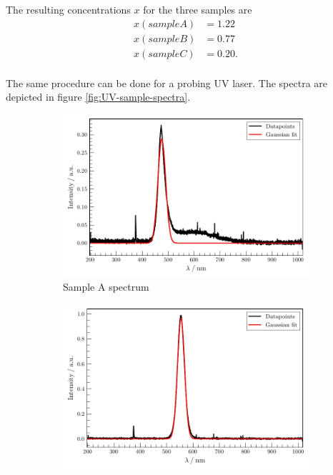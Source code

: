The resulting concentrations $x$ for the three samples are
\begin{align*}
    x(sample A) &= \num{1.22}\\
    x(sample B) &= \num{0.77}\\
    x(sample C) &= \num{0.20}.\\
\end{align*}

The same procedure can be done for a probing UV laser. The spectra are depicted in figure \ref{fig:UV-sample-spectra}.
\begin{figure}
    \centering
\begin{subfigure}{.3\textwidth}
    \centering
    \includegraphics[width=\textwidth]{plots/Samp_A_D_UV.pdf}
    \caption{Sample A spectrum}
\end{subfigure}
\begin{subfigure}{.3\textwidth}
    \centering
    \includegraphics[width=\textwidth]{plots/Samp_B_D_UV.pdf}

\end{subfigure}
\end{figure}
